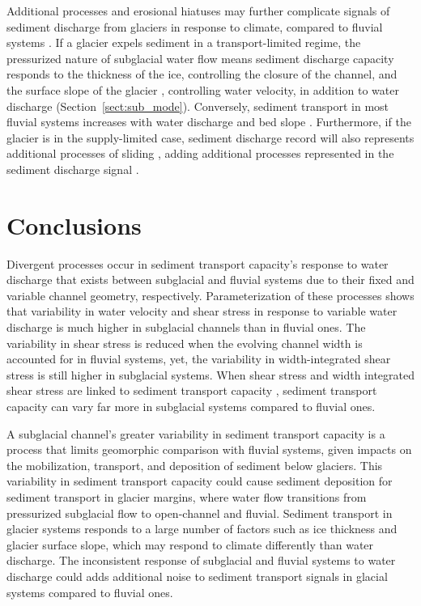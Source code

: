 \documentclass[11pt]{article}
\begin{document}
\begin{spacing}{1}
  Additional processes and erosional hiatuses may further complicate signals of sediment discharge from glaciers in response to climate, compared to fluvial systems \citep{jansson2005,ganti2016}. 
  If a glacier expels sediment in a transport-limited regime, the pressurized nature of subglacial water flow means sediment discharge capacity responds to the thickness of the ice, controlling the closure of the channel, and the surface slope of the glacier \citep{rothlisberger1972,shreve1972}, controlling water velocity, in addition to water discharge (Section~\ref{sect:sub_mode}).
  Conversely, sediment transport in most fluvial systems increases with water discharge and bed slope \citep[Section~\ref{sect:fluv}; e.g.][]{muller1968,whipple1999,wong2006}. 
  Furthermore, if the glacier is in the supply-limited case, sediment discharge record will also represents additional processes of sliding  \citep{herman2015,seguinot2021}, adding additional processes represented in the sediment discharge signal \citep{delaney2019}.

  
  \section{Conclusions}
  
  Divergent processes occur in sediment transport capacity's response to water discharge that exists between subglacial and fluvial systems due to their fixed and variable channel geometry, respectively.
  Parameterization of these processes shows that variability in water velocity and shear stress in response to variable water discharge is much higher in subglacial channels than in fluvial ones.
  The variability in shear stress is reduced when the evolving channel width is accounted for in fluvial systems, yet, the variability in width-integrated shear stress is still higher in subglacial systems.
  When shear stress and width integrated shear stress are linked to sediment transport capacity \citep[e.g.][]{shields1936,meyer1948,engelund1967}, sediment transport capacity can vary far more in subglacial systems compared to fluvial ones.

  A subglacial channel's greater variability in sediment transport capacity is a process that limits geomorphic comparison with fluvial systems, given impacts on the mobilization, transport, and deposition of sediment below glaciers.
  This variability in sediment transport capacity could cause sediment deposition for sediment transport in glacier margins, where water flow transitions from pressurized subglacial flow to open-channel and fluvial.
  Sediment transport in glacier systems responds to a large number of factors such as ice thickness and glacier surface slope, which may respond to climate differently than water discharge. 
  The inconsistent response of subglacial and fluvial systems to water discharge could adds additional noise to sediment transport signals in glacial systems compared to fluvial ones.
  

\end{spacing}
\end{document}
